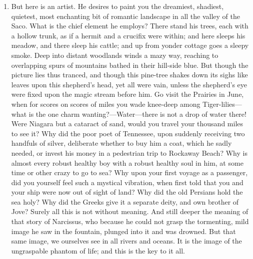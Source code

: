 \documentclass{../armymemo}
\begin{document}
\begin{enumerate}
\begin{enumerate}
  \item But here is an artist. He desires to paint you the dreamiest, shadiest,
    quietest, most enchanting bit of romantic landscape in all the valley of the
    Saco. What is the chief element he employs? There stand his trees, each with
    a hollow trunk, as if a hermit and a crucifix were within; and here sleeps
    his meadow, and there sleep his cattle; and up from yonder cottage goes a
    sleepy smoke. Deep into distant woodlands winds a mazy way, reaching to
    overlapping spurs of mountains bathed in their hill-side blue. But though
    the picture lies thus tranced, and though this pine-tree shakes down its
    sighs like leaves upon this shepherd’s head, yet all were vain, unless the
    shepherd’s eye were fixed upon the magic stream before him. Go visit the
    Prairies in June, when for scores on scores of miles you wade knee-deep
    among Tiger-lilies—what is the one charm wanting?—Water—there is not a drop
    of water there! Were Niagara but a cataract of sand, would you travel your
    thousand miles to see it? Why did the poor poet of Tennessee, upon suddenly
    receiving two handfuls of silver, deliberate whether to buy him a coat,
    which he sadly needed, or invest his money in a pedestrian trip to Rockaway
    Beach? Why is almost every robust healthy boy with a robust healthy soul in
    him, at some time or other crazy to go to sea?  Why upon your first voyage
    as a passenger, did you yourself feel such a mystical vibration, when first
    told that you and your ship were now out of sight of land? Why did the old
    Persians hold the sea holy? Why did the Greeks give it a separate deity, and
    own brother of Jove? Surely all this is not without meaning. And still
    deeper the meaning of that story of Narcissus, who because he could not
    grasp the tormenting, mild image he saw in the fountain, plunged into it and
    was drowned. But that same image, we ourselves see in all rivers and
    oceans. It is the image of the ungraspable phantom of life; and this is the
    key to it all.
    

\end{enumerate}
\end{enumerate}
\end{document}
